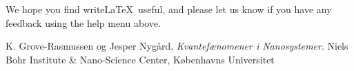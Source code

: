 \documentclass[a4paper]{article}
\begin{document}
We hope you find write\LaTeX\ useful, and please let us know if you have any feedback using the help menu above.

\begin{thebibliography}{9}
  K. Grove-Rasmussen og Jesper Nygård,
  \emph{Kvantefænomener i Nanosystemer}.
  Niels Bohr Institute \& Nano-Science Center, Københavns Universitet

\end{thebibliography}
\fi
\end{document}

